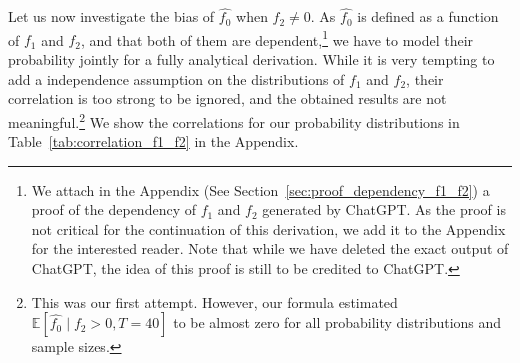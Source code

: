 \documentclass{article}
\newcommand{\stepandtag}{%
  \refstepcounter{equation}%
  \tag{\theequation}%
}
\begin{document}
Let us now investigate the bias of $\hat{f_0}$ when $f_2 \neq 0$. As $\hat{f_0}$ is defined as a function of $f_1$ and $f_2$, and that both of them are dependent,\!\footnote{We attach in the Appendix (See Section~\ref{sec:proof_dependency_f1_f2}) a proof of the dependency of $f_1$ and $f_2$ generated by ChatGPT.  As the proof is not critical for the continuation of this derivation, we add it to the Appendix for the interested reader. Note that while we have deleted the exact output of ChatGPT, the idea of this proof is still to be credited to ChatGPT.} we have to model their probability jointly for a fully analytical derivation.
While it is very tempting to add a independence assumption on the distributions of $f_1$ and $f_2$, their correlation is too strong to be ignored, and the obtained results are not meaningful.\!\footnote{This was our first attempt. However, our formula estimated $\mathbb{E}[\hat{f_0}\mid f_2 > 0, T=40]$ to be almost zero for all probability distributions and sample sizes.}
We show the correlations for our probability distributions in Table~\ref{tab:correlation_f1_f2} in the Appendix.

\end{document}
